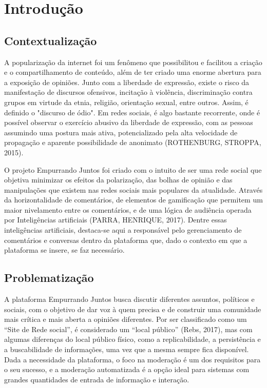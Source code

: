 \chapter[Introdução]{Introdução}
\section[Contextualização]{Contextualização}

A popularização da internet foi um fenômeno que possibilitou e facilitou a criação e o compartilhamento de conteúdo, além de ter criado uma enorme abertura para a exposição de opiniões. Junto com a liberdade de expressão, existe o risco da manifestação de discursos ofensivos, incitação à violência, discriminação contra grupos em virtude da etnia, religião, orientação sexual, entre outros. Assim, é definido o "discurso de ódio". Em redes sociais, é algo bastante recorrente, onde é possível observar o exercício abusivo da liberdade de expressão, com as pessoas assumindo uma postura mais ativa, potencializado pela alta velocidade de propagação e aparente possibilidade de anonimato (ROTHENBURG, STROPPA, 2015). 

O projeto Empurrando Juntos foi criado com o intuito de ser uma rede social que objetiva minimizar os efeitos da polarização, das bolhas de opinião e das manipulações que existem nas redes sociais mais populares da atualidade. Através da horizontalidade de comentários, de elementos de gamificação que permitem um maior nivelamento entre os comentários, e de uma lógica de audiência operada por Inteligências artificiais (PARRA, HENRIQUE, 2017). Dentre essas inteligências artificiais, destaca-se aqui a responsável pelo gerenciamento de comentários e conversas dentro da plataforma que, dado o contexto em que a plataforma se insere, se faz necessário.

\section[Problematização]{Problematização}


A plataforma Empurrando Juntos busca discutir diferentes assuntos, políticos e sociais, com o objetivo de dar voz à quem precisa e de construir uma comunidade mais crítica e mais aberta a opiniões diferentes. Por ser classificado como um “Site de Rede social”, é considerado um “local público” (Rebs, 2017), mas com algumas diferenças do local público físico, como a replicabilidade, a persistência e a buscabilidade de informações, uma vez que a mesma sempre fica disponível. Dada a necessidade da plataforma, o foco na moderação é um dos requisitos para o seu sucesso, e a moderação automatizada é a opção ideal para sistemas com grandes quantidades de entrada de informação e interação.

